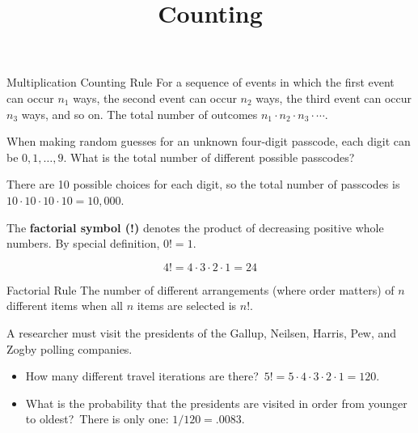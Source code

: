 \documentclass{beamer}
\title[MA205 - Section 4.3]{Counting}
\begin{document}
\begin{frame}
\titlepage
\end{frame}

\begin{frame}
\begin{block}{Multiplication Counting Rule}
For a sequence of events in which the first event can occur $n_1$ ways, the second event can occur $n_2$ ways, the third event can occur $n_3$ ways, and so on. The total number of outcomes $n_1\cdot n_2\cdot n_3\cdot\cdots$.
\end{block}\pause

\begin{example}
When making random guesses for an unknown four-digit passcode, each digit can be $0,1,\ldots,9$. What is the total number of different possible passcodes?\pause

\vspace{1mm}
There are 10 possible choices for each digit, so the total number of passcodes is $10\cdot 10\cdot 10\cdot 10 = 10,000$.
\end{example}
\end{frame}

\begin{frame}
\begin{definition}
The \textbf{factorial symbol (!)} denotes the product of decreasing positive whole numbers. By special definition, $0!=1$.
\end{definition}\pause

\begin{example}
\vspace{-3mm}
\begin{equation*}
4!=4\cdot3\cdot2\cdot1=24
\end{equation*}
\end{example}\pause

\begin{block}{Factorial Rule}
The number of different arrangements (where order matters) of $n$ different items when all $n$ items are selected is $n!$. %
\end{block}\pause

\begin{example}
A researcher must visit the presidents of the Gallup, Neilsen, Harris, Pew, and Zogby polling companies.
\begin{itemize}
\item How many different travel iterations are there?\pause\ $5!=5\cdot4\cdot3\cdot2\cdot1=120$.\pause
\item What is the probability that the presidents are visited in order from younger to oldest?\pause~There is only one: $1/120=.0083$.
\end{itemize}
\end{example}
\end{frame}
\end{document}
